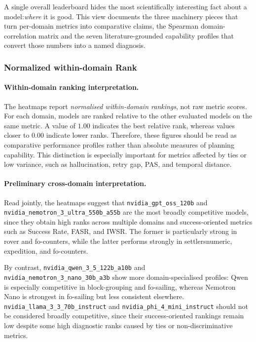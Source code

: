 A single overall leaderboard hides the most scientifically interesting fact about a model:\emph{where} it is good. This view documents the three machinery pieces that turn per-domain metrics into comparative claims, the Spearman domain-correlation matrix  and the seven literature-grounded capability profiles that convert those numbers into a named diagnosis.

\subsubsection{Normalized within-domain Rank}
\paragraph{Within-domain ranking interpretation.}
The heatmaps report \emph{normalised within-domain rankings}, not raw metric
scores. For each domain, models are ranked relative to the other evaluated
models on the same metric. A value of $1.00$ indicates the best relative rank,
whereas values closer to $0.00$ indicate lower ranks. Therefore, these figures
should be read as comparative performance profiles rather than absolute measures
of planning capability. This distinction is especially important for metrics
affected by ties or low variance, such as hallucination, retry gap, PAS, and
temporal distance.

\paragraph{Preliminary cross-domain interpretation.}
Read jointly, the heatmaps suggest that \texttt{nvidia\_gpt\_oss\_120b} and
\texttt{nvidia\_nemotron\_3\_ultra\_550b\_a55b} are the most broadly competitive
models, since they obtain high ranks across multiple domains and success-oriented
metrics such as Success Rate, FASR, and IWSR. The former is particularly strong
in rover and fo-counters, while the latter performs strongly in settlersnumeric,
expedition, and fo-counters.

By contrast, \texttt{nvidia\_qwen\_3\_5\_122b\_a10b} and
\texttt{nvidia\_nemotron\_3\_nano\_30b\_a3b} show more domain-specialised
profiles: Qwen is especially competitive in block-grouping and fo-sailing,
whereas Nemotron Nano is strongest in fo-sailing but less consistent elsewhere.
\texttt{nvidia\_llama\_3\_3\_70b\_instruct} and
\texttt{nvidia\_phi\_4\_mini\_instruct} should not be considered broadly
competitive, since their success-oriented rankings remain low despite some high
diagnostic ranks caused by ties or non-discriminative metrics.

